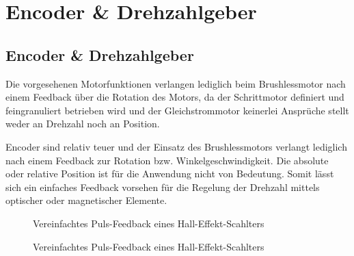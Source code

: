 \ifSTANDALONE
\section{Encoder \& Drehzahlgeber}
\fi
\ifEMBED
\subsection{Encoder \& Drehzahlgeber}
\fi

Die vorgesehenen Motorfunktionen verlangen lediglich beim Brushlessmotor
nach einem Feedback über die Rotation des Motors, da der Schrittmotor
definiert und feingranuliert betrieben wird und der Gleichstrommotor
keinerlei Ansprüche stellt weder an Drehzahl noch an Position.

Encoder sind relativ teuer und der Einsatz des Brushlessmotors verlangt
lediglich nach einem Feedback zur Rotation bzw. Winkelgeschwindigkeit.
Die absolute oder relative Position ist für die Anwendung nicht von
Bedeutung. Somit lässt sich ein einfaches Feedback vorsehen für die
Regelung der Drehzahl mittels optischer oder magnetischer Elemente.
\ifSTANDALONE
\begin{figure}[h!]
	\centering
	\caption{Vereinfachtes Puls-Feedback eines Hall-Effekt-Scahlters}
	\label{fig:hall-effekt-schalter}
\end{figure}
\fi
\ifEMBED
\begin{figure}[h!]
	\centering
	\caption{Vereinfachtes Puls-Feedback eines Hall-Effekt-Scahlters}
	\label{fig:hall-effekt-schalter}
\end{figure}
